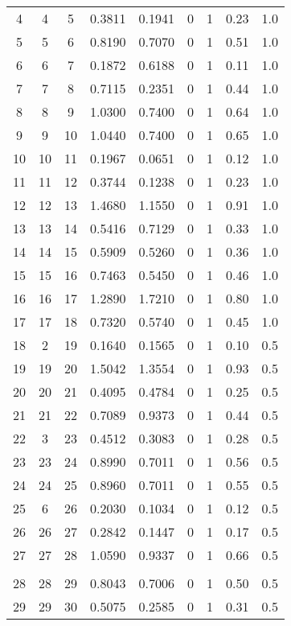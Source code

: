 \begin{longtable}{ccccccccc}
		4 & 4 & 5 & 0.3811 & 0.1941 & 0 & 1 & 0.23 & 1.0 \\
		5 & 5 & 6 & 0.8190 & 0.7070 & 0 & 1 & 0.51 & 1.0 \\
		6 & 6 & 7 & 0.1872 & 0.6188 & 0 & 1 & 0.11 & 1.0 \\
		7 & 7 & 8 & 0.7115 & 0.2351 & 0 & 1 & 0.44 & 1.0 \\
		8 & 8 & 9 & 1.0300 & 0.7400 & 0 & 1 & 0.64 & 1.0 \\
		9 & 9 & 10 & 1.0440 & 0.7400 & 0 & 1 & 0.65 & 1.0 \\
		10 & 10 & 11 & 0.1967 & 0.0651 & 0 & 1 & 0.12 & 1.0 \\
		11 & 11 & 12 & 0.3744 & 0.1238 & 0 & 1 & 0.23 & 1.0 \\
		12 & 12 & 13 & 1.4680 & 1.1550 & 0 & 1 & 0.91 & 1.0 \\
		13 & 13 & 14 & 0.5416 & 0.7129 & 0 & 1 & 0.33 & 1.0 \\
		14 & 14 & 15 & 0.5909 & 0.5260 & 0 & 1 & 0.36 & 1.0 \\
		15 & 15 & 16 & 0.7463 & 0.5450 & 0 & 1 & 0.46 & 1.0 \\
		16 & 16 & 17 & 1.2890 & 1.7210 & 0 & 1 & 0.80 & 1.0 \\
		17 & 17 & 18 & 0.7320 & 0.5740 & 0 & 1 & 0.45 & 1.0 \\
		18 & 2 & 19 & 0.1640 & 0.1565 & 0 & 1 & 0.10 & 0.5 \\
		19 & 19 & 20 & 1.5042 & 1.3554 & 0 & 1 & 0.93 & 0.5 \\
		20 & 20 & 21 & 0.4095 & 0.4784 & 0 & 1 & 0.25 & 0.5 \\
		21 & 21 & 22 & 0.7089 & 0.9373 & 0 & 1 & 0.44 & 0.5 \\
		22 & 3 & 23 & 0.4512 & 0.3083 & 0 & 1 & 0.28 & 0.5 \\
		23 & 23 & 24 & 0.8990 & 0.7011 & 0 & 1 & 0.56 & 0.5 \\
		24 & 24 & 25 & 0.8960 & 0.7011 & 0 & 1 & 0.55 & 0.5 \\
		25 & 6 & 26 & 0.2030 & 0.1034 & 0 & 1 & 0.12 & 0.5 \\
		26 & 26 & 27 & 0.2842 & 0.1447 & 0 & 1 & 0.17 & 0.5 \\
		27 & 27 & 28 & 1.0590 & 0.9337 & 0 & 1 & 0.66 & 0.5 \\
		\toprule\\
		\hline
		28 & 28 & 29 & 0.8043 & 0.7006 & 0 & 1 & 0.50 & 0.5 \\
		29 & 29 & 30 & 0.5075 & 0.2585 & 0 & 1 & 0.31 & 0.5 \\

\end{longtable}
